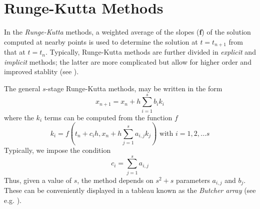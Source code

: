 \section{Runge-Kutta Methods}\label{sec:runge-kutta}

In the \emph{Runge-Kutta} methods, a weighted average of the slopes ($\bm{f}$) of 
the solution computed at nearby points is used to determine the solution at 
$t = t_{n+1}$ from that at $t = t_n$. Typically, Runge-Kutta methods are further 
divided in \emph{explicit} and \emph{implicit} methods; the latter are more complicated 
but allow for higher order and improved stablity (see \cite{Griffiths2010}).

The general $s$-stage Runge-Kutta methods, may be written in the form
\begin{equation}\label{eq:grif95}
    x_{n+1} = x_n + h \sum_{i=1}^{s} b_i k_i 
\end{equation}
where the $k_i$ terms can be computed from the function $f$
\begin{equation}\label{eq:grif96}
    k_i = f \left( t_n + c_i h , x_n + h \sum_{j=1}^{s} a_{i,j} k_j \right) \text{ with } i = 1,2,\dots s
\end{equation}
Typically, we impose the condition
\begin{equation}
    c_i = \sum_{j=1}^{s} a_{i,j}
\end{equation}
Thus, given a value of $s$, the method depends on $s^2 + s$ parameters $a_{i,j}$ and $b_j$.
These can be conveniently displayed in a tableau known as the \emph{Butcher array} 
(see e.g. \cite{Butcher2016}).

